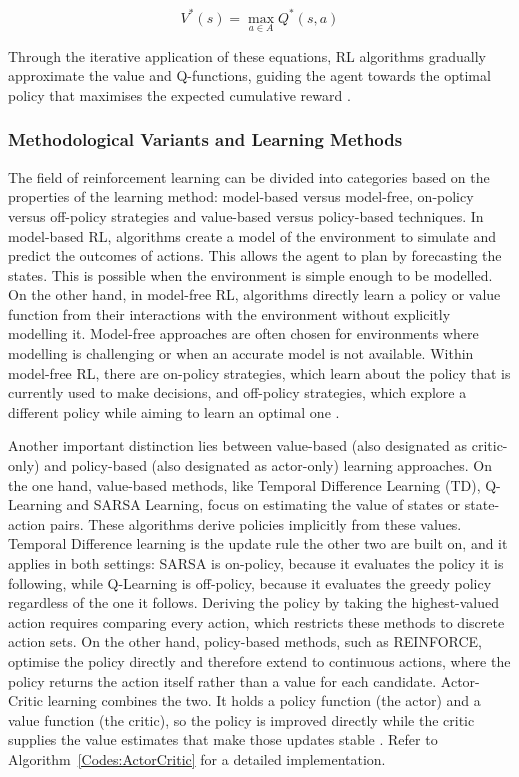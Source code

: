 \begin{equation}
V^*(s) = \max_{a \in A} Q^*(s, a)
\end{equation}

Through the iterative application of these equations, RL algorithms gradually approximate the value and Q-functions, guiding the agent towards the optimal policy that maximises the expected cumulative reward \cite{sutton_reinforcement_2018}.

\subsubsection{Methodological Variants and Learning Methods}

The field of reinforcement learning can be divided into categories based on the properties of the learning method: model-based versus model-free, on-policy versus off-policy strategies and value-based versus policy-based techniques. In model-based RL, algorithms create a model of the environment to simulate and predict the outcomes of actions. This allows the agent to plan by forecasting the states. This is possible when the environment is simple enough to be modelled. On the other hand, in model-free RL, algorithms directly learn a policy or value function from their interactions with the environment without explicitly modelling it. Model-free approaches are often chosen for environments where modelling is challenging or when an accurate model is not available. Within model-free RL, there are on-policy strategies, which learn about the policy that is currently used to make decisions, and off-policy strategies, which explore a different policy while aiming to learn an optimal one \cite{sutton_reinforcement_2018}.

Another important distinction lies between value-based (also designated as critic-only) and policy-based (also designated as actor-only) learning approaches. On the one hand, value-based methods, like Temporal Difference Learning (TD), Q-Learning and SARSA Learning, focus on estimating the value of states or state-action pairs. These algorithms derive policies implicitly from these values. Temporal Difference learning is the update rule the other two are built on, and it applies in both settings: SARSA is on-policy, because it evaluates the policy it is following, while Q-Learning is off-policy, because it evaluates the greedy policy regardless of the one it follows. Deriving the policy by taking the highest-valued action requires comparing every action, which restricts these methods to discrete action sets. On the other hand, policy-based methods, such as REINFORCE, optimise the policy directly and therefore extend to continuous actions, where the policy returns the action itself rather than a value for each candidate. Actor-Critic learning combines the two. It holds a policy function (the actor) and a value function (the critic), so the policy is improved directly while the critic supplies the value estimates that make those updates stable \cite{sutton_reinforcement_2018}. Refer to Algorithm~\ref{Codes:ActorCritic} for a detailed implementation.

